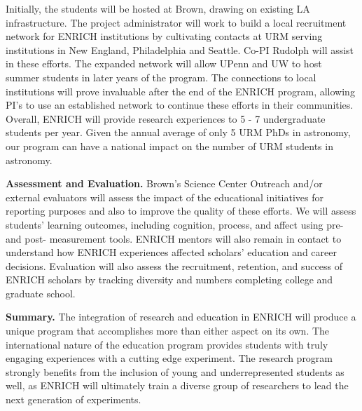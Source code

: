 \documentclass[preprint,11pt]{aastex}
\begin{document}
Initially, the students will be hosted at Brown, drawing on existing LA infrastructure.  
The project administrator will work to build a local recruitment network for ENRICH institutions by cultivating contacts at URM serving institutions in New England, Philadelphia and Seattle.  Co-PI Rudolph will assist in these efforts.  
The expanded network will allow UPenn and UW to host summer students in later years of the program.  The connections to local institutions will prove invaluable after the end of the ENRICH program, allowing 
PI's to use an established network to continue these efforts in their communities.
Overall, ENRICH will provide research experiences to 5 - 7 undergraduate students per year. Given the 
annual average of only 5 URM PhDs 
in astronomy, our program can have a national impact on the number of 
URM students in astronomy.

\textbf{Assessment and Evaluation.} 
Brown's Science Center Outreach 
and/or external evaluators
will 
assess the impact of the educational initiatives for reporting purposes and also to improve the quality of these efforts. %
We will assess 
students' learning outcomes, including cognition, 
process,
and affect 
using pre- and post- measurement tools.
ENRICH mentors will also 
remain in contact
to understand how ENRICH experiences affected scholars' education and career decisions.
Evaluation will also assess the recruitment, retention, and success of ENRICH scholars by tracking 
diversity and numbers %
completing college and graduate school.  

\textbf{Summary.} The integration of research and education in ENRICH will produce a unique program that accomplishes more than either aspect on its own.  The international nature of the education program provides students with truly engaging experiences with a cutting edge experiment.  The research program strongly benefits from the inclusion of young and underrepresented students as well, as ENRICH will ultimately train a diverse group of researchers to lead the next generation of experiments.  

\clearpage
\setcounter{page}{1}
\thispagestyle{empty}


\end{document}
